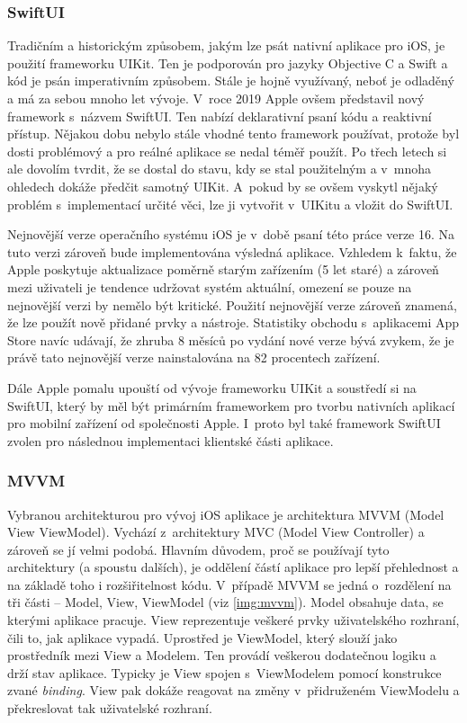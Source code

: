\documentclass[thesis=M,czech]{FITthesis}[2019/12/23]
\begin{document}
\subsubsection{SwiftUI}
Tradičním a historickým způsobem, jakým lze psát nativní aplikace pro iOS, je použití frameworku UIKit. Ten je podporován pro jazyky Objective C a Swift a kód je psán imperativním způsobem. Stále je hojně využívaný, neboť je odladěný a má za sebou mnoho let vývoje. V~roce 2019 Apple ovšem představil nový framework s~názvem SwiftUI. Ten nabízí deklarativní psaní kódu a reaktivní přístup. Nějakou dobu nebylo stále vhodné tento framework používat, protože byl dosti problémový a pro reálné aplikace se nedal téměř použít. Po třech letech si ale dovolím tvrdit, že se dostal do stavu, kdy se stal použitelným a v~mnoha ohledech dokáže předčit samotný UIKit. A~pokud by se ovšem vyskytl nějaký problém s~implementací určité věci, lze ji vytvořit v~UIKitu a vložit do SwiftUI. \cite{swiftui}

Nejnovější verze operačního systému iOS je v~době psaní této práce verze 16. Na tuto verzi zároveň bude implementována výsledná aplikace. Vzhledem k~faktu, že Apple poskytuje aktualizace poměrně starým zařízením (5 let staré) a zároveň mezi uživateli je tendence udržovat systém aktuální, omezení se pouze na nejnovější verzi by nemělo být kritické. Použití nejnovější verze zároveň znamená, že lze použít nově přidané prvky a nástroje. Statistiky obchodu s~aplikacemi App Store \cite{app-store-stats} navíc udávají, že zhruba 8 měsíců po vydání nové verze bývá zvykem, že je právě tato nejnovější verze nainstalována na 82 procentech zařízení.

Dále Apple pomalu upouští od vývoje frameworku UIKit a soustředí si na SwiftUI, který by měl být primárním frameworkem pro tvorbu nativních aplikací pro mobilní zařízení od společnosti Apple. I~proto byl také framework SwiftUI zvolen pro následnou implementaci klientské části aplikace.

\subsubsection{MVVM}
Vybranou architekturou pro vývoj iOS aplikace je architektura MVVM (Model View ViewModel). Vychází z~architektury MVC (Model View Controller) a zároveň se jí velmi podobá. Hlavním důvodem, proč se používají tyto architektury (a spoustu dalších), je oddělení částí aplikace pro lepší přehlednost a na základě toho i rozšiřitelnost kódu. V~případě MVVM se jedná o~rozdělení na tři části -- Model, View, ViewModel (viz \ref{img:mvvm}). Model obsahuje data, se kterými aplikace pracuje. View reprezentuje veškeré prvky uživatelského rozhraní, čili to, jak aplikace vypadá. Uprostřed je ViewModel, který slouží jako prostředník mezi View a Modelem. Ten provádí veškerou dodatečnou logiku a drží stav aplikace. Typicky je View spojen s~ViewModelem pomocí konstrukce zvané \textit{binding}. View pak dokáže reagovat na změny v~přidruženém ViewModelu a překreslovat tak uživatelské rozhraní. \cite{mvvm-1}
\end{document}
